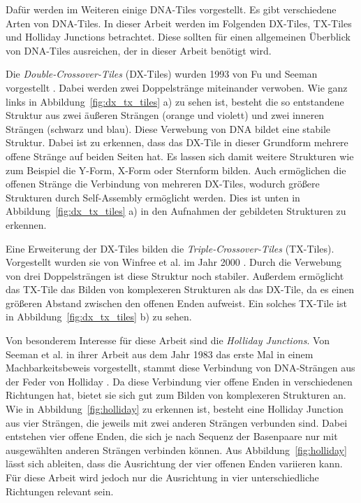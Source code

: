 Dafür werden im Weiteren einige DNA-Tiles vorgestellt. 
Es gibt verschiedene Arten von DNA-Tiles. In dieser Arbeit werden im Folgenden DX-Tiles, TX-Tiles und Holliday Junctions betrachtet. 
Diese sollten für einen allgemeinen Überblick von DNA-Tiles ausreichen, der in dieser Arbeit benötigt wird.

Die \emph{Double-Crossover-Tiles} (DX-Tiles) wurden 1993 von Fu und Seeman vorgestellt \cite{fu1993dx}. Dabei werden zwei Doppelstränge miteinander verwoben. 
Wie ganz links in Abbildung~\ref{fig:dx_tx_tiles} a) zu sehen ist, besteht die so entstandene Struktur aus zwei äußeren Strängen (orange und violett) und zwei inneren Strängen (schwarz und blau). 
Diese Verwebung von DNA bildet eine stabile Struktur. Dabei ist zu erkennen, dass das DX-Tile in dieser Grundform mehrere offene Stränge auf beiden Seiten hat. 
Es lassen sich damit weitere Strukturen wie zum Beispiel die Y-Form, X-Form oder Sternform bilden.
Auch ermöglichen die offenen Stränge die Verbindung von mehreren DX-Tiles, wodurch größere Strukturen durch Self-Assembly ermöglicht werden. Dies ist unten in Abbildung~\ref{fig:dx_tx_tiles} a) in den Aufnahmen der gebildeten Strukturen zu erkennen.

Eine Erweiterung der DX-Tiles bilden die \emph{Triple-Crossover-Tiles} (TX-Tiles). 
Vorgestellt wurden sie von Winfree et al. im Jahr 2000 \cite{winfree2000tx}. 
Durch die Verwebung von drei Doppelsträngen ist diese Struktur noch stabiler.
Außerdem ermöglicht das TX-Tile das Bilden von komplexeren Strukturen als das DX-Tile, da es einen größeren Abstand zwischen den offenen Enden aufweist.
Ein solches TX-Tile ist in Abbildung~\ref{fig:dx_tx_tiles} b) zu sehen.

Von besonderem Interesse für diese Arbeit sind die \emph{Holliday Junctions}. 
Von Seeman et al. \cite{kallenbach1983immobile} in ihrer Arbeit aus dem Jahr 1983 das erste Mal in einem Machbarkeitsbeweis vorgestellt, stammt diese Verbindung von DNA-Strängen aus der Feder von Holliday \cite{holliday1974molecular}.
Da diese Verbindung vier offene Enden in verschiedenen Richtungen hat, bietet sie sich gut zum Bilden von komplexeren Strukturen an. 
Wie in Abbildung~\ref{fig:holliday} zu erkennen ist, besteht eine Holliday Junction aus vier Strängen, die jeweils mit zwei anderen Strängen verbunden sind. 
Dabei entstehen vier offene Enden, die sich je nach Sequenz der Basenpaare nur mit ausgewählten anderen Strängen verbinden können. 
Aus Abbildung~\ref{fig:holliday} lässt sich ableiten, dass die Ausrichtung der vier offenen Enden variieren kann.
Für diese Arbeit wird jedoch nur die Ausrichtung in vier unterschiedliche Richtungen relevant sein.


